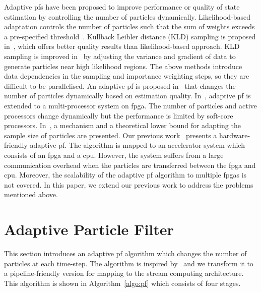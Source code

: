 Adaptive \gls{pf}s have been proposed to improve performance or quality of state estimation by controlling the number of particles dynamically. 
Likelihood-based adaptation controls the number of particles such that the sum of weights exceeds a pre-specified threshold~\cite{koller98}.
Kullback Leibler distance (KLD) sampling is proposed in~\cite{fox03}, which offers better quality results than likelihood-based approach. 
KLD sampling is improved in~\cite{park10} by adjusting the variance and gradient of data to generate particles near high likelihood regions. 
The above methods introduce data dependencies in the sampling and importance weighting steps, so they are difficult to be parallelised. 
An adaptive \gls{pf} is proposed in~\cite{bolic02} that changes the number of particles dynamically based on estimation quality. 
In~\cite{chau12}, adaptive \gls{pf} is extended to a multi-processor system on \gls{fpga}.
The number of particles and active processors change dynamically but the performance is limited by soft-core processors.
In~\cite{liu07}, a mechanism and a theoretical lower bound for adapting the sample size of particles are presented.
Our previous work~\cite{chau13a} presents a hardware-friendly adaptive \gls{pf}. 
The algorithm is mapped to an accelerator system which consists of an \gls{fpga} and a \gls{cpu}.
However, the system suffers from a large communication overhead when the particles are transferred between the \gls{fpga} and \gls{cpu}.
Moreover, the scalability of the adaptive \gls{pf} algorithm to multiple \gls{fpga}s is not covered.
In this paper, we extend our previous work to address the problems mentioned above.

\section{Adaptive Particle Filter}
\label{sec:apf}

This section introduces an adaptive \gls{pf} algorithm which changes the number of particles at each time-step.
The algorithm is inspired by~\cite{liu07} and we transform it to a pipeline-friendly version for mapping to the stream computing architecture.
This algorithm is shown in Algorithm~\ref{algo:pf} which consists of four stages.

